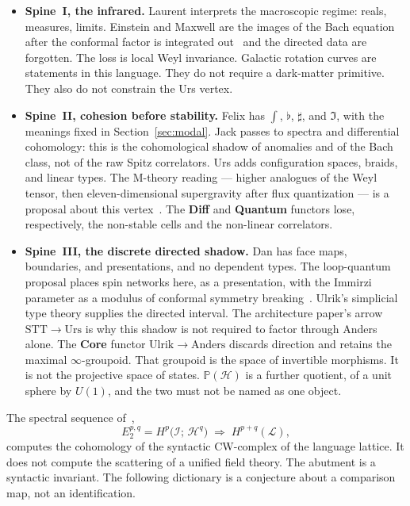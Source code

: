 \documentclass{article}
\theoremstyle{definition}
\newcommand{\Hilb}{\mathcal{H}}
\newcommand{\shape}{\int}
\begin{document}
\begin{itemize}
  \item \textbf{Spine~I, the infrared.}
        Laurent interprets the macroscopic regime: reals, measures, limits.
        Einstein and Maxwell are the images of the Bach equation after the
        conformal factor is integrated out~\cite{tHooft} and the directed data
        are forgotten.  The loss is local Weyl invariance.  Galactic rotation
        curves are statements in this language.  They do not require a
        dark-matter primitive.  They also do not constrain the Urs vertex.
  \item \textbf{Spine~II, cohesion before stability.}
        Felix has \(\shape\), \(\flat\), \(\sharp\), and \(\Im\), with the
        meanings fixed in Section~\ref{sec:modal}.  Jack passes to spectra and
        differential cohomology: this is the cohomological shadow of anomalies
        and of the Bach class, not of the raw Spitz correlators.  Urs adds
        configuration spaces, braids, and linear types.  The M-theory reading
        --- higher analogues of the Weyl tensor, then eleven-dimensional
        supergravity after flux quantization --- is a proposal about this
        vertex~\cite{TonpaConf}.  The \textbf{Diff} and \textbf{Quantum}
        functors lose, respectively, the non-stable cells and the non-linear
        correlators.
  \item \textbf{Spine~III, the discrete directed shadow.}
        Dan has face maps, boundaries, and presentations, and no dependent
        types.  The loop-quantum proposal places spin networks here, as a
        presentation, with the Immirzi parameter as a modulus of conformal
        symmetry breaking~\cite{TonpaConf}.  Ulrik's simplicial type theory
        supplies the directed interval.  The architecture paper's arrow
        \(\mathrm{STT}\to\mathrm{Urs}\) is why this shadow is not required to
        factor through Anders alone.  The \textbf{Core} functor
        \(\mathrm{Ulrik}\to\mathrm{Anders}\) discards direction and retains
        the maximal \(\infty\)-groupoid.  That groupoid is the space of
        invertible morphisms.  It is not the projective space of states.
        \(\mathbb{P}(\Hilb)\) is a further quotient, of a unit sphere by
        \(U(1)\), and the two must not be named as one object.
\end{itemize}

The spectral sequence of~\cite{GIArch},
\[
  E_2^{p,q}
    = H^p\bigl(\mathcal{I};\,\mathcal{H}^q\bigr)
    \;\Longrightarrow\;
    H^{p+q}(\mathcal{L}),
\]
computes the cohomology of the syntactic CW-complex of the language lattice.
It does not compute the scattering of a unified field theory.  The abutment
is a syntactic invariant.  The following dictionary is a conjecture about a
comparison map, not an identification.
\end{document}
